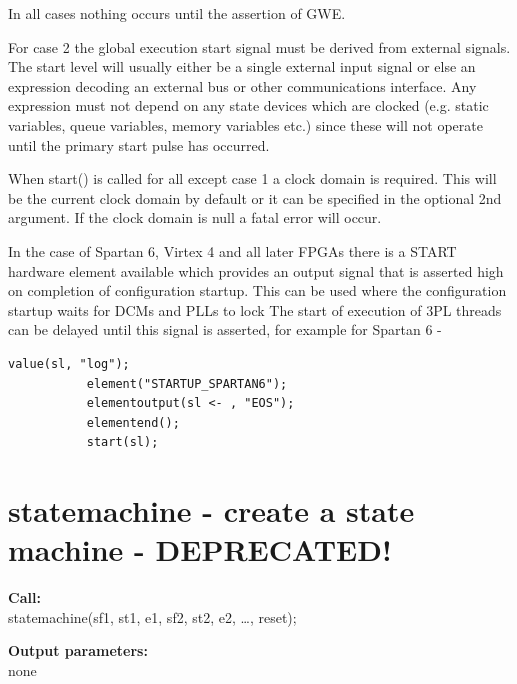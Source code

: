         In all cases nothing occurs until the assertion of GWE.
        
        For case 2 the global execution start signal must be derived from
        external signals. The start level will usually either be a single
        external input signal or else an expression decoding an external bus or
        other communications interface. Any expression must not depend on any
        state devices which are clocked (e.g. static variables, queue variables,
        memory variables etc.) since these will not operate until the primary
        start pulse has occurred.     
        
        When start() is called for all except case 1 a clock domain is required.
        This will be the current clock domain by default or it can be specified in
        the optional 2nd argument. If the clock domain is null a fatal error will
        occur.
        
        In the case of Spartan 6, Virtex 4 and all later FPGAs there is a 
        START hardware element available which provides an output signal that
        is asserted high on completion of configuration startup. This can be used
        where the configuration startup waits for DCMs and PLLs to lock The start
        of execution of 3PL threads can be delayed until this signal is asserted,
        for example for Spartan 6 -
        
        \begin{lstlisting}[gobble=8, language=threepl]
           value(sl, "log");
           element("STARTUP_SPARTAN6");
           elementoutput(sl <- , "EOS");
           elementend();
           start(sl);
        \end{lstlisting}
        





    \section{statemachine - create a state machine - DEPRECATED!}\label{sec:ipstatemachine}
        
        {\bf Call:} \\
        statemachine(sf1, st1, e1, sf2, st2, e2, \dots, reset);
        
        {\bf Output parameters:} \\
        none
        
